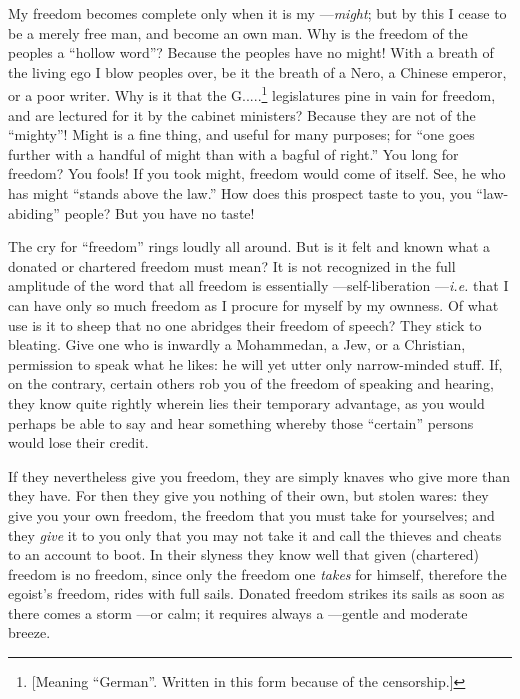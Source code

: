 My freedom becomes complete only when it is my ---\textit{might}; but by this 
I cease to be a merely free man, and become an own man. Why is the freedom of 
the peoples a ``hollow word''? Because the peoples have no might! With a 
breath of the living ego I blow peoples over, be it the breath of a Nero, a 
Chinese emperor, or a poor writer. Why is it that the G.....\footnote{[Meaning 
``German''. Written in this form because of the censorship.]} legislatures 
pine in vain for freedom, and are lectured for it by the cabinet ministers? 
Because they are not of the ``mighty''! Might is a fine thing, and useful 
for many purposes; for ``one goes further with a handful of might than with a 
bagful of right.'' You long for freedom? You fools! If you took might, 
freedom would come of itself. See, he who has might ``stands above the 
law.'' How does this prospect taste to you, you ``law-abiding'' people? But 
you have no taste!

The cry for ``freedom'' rings loudly all around. But is it felt and known 
what a donated or chartered freedom must mean? It is not recognized in the 
full amplitude of the word that all freedom is essentially ---self-liberation ---\textit{i.e.} that I can have only so much freedom as I procure for myself 
by my ownness. Of what use is it to sheep that no one abridges their freedom 
of speech? They stick to bleating. Give one who is inwardly a Mohammedan, a 
Jew, or a Christian, permission to speak what he likes: he will yet utter only 
narrow-minded stuff. If, on the contrary, certain others rob you of the 
freedom of speaking and hearing, they know quite rightly wherein lies their 
temporary advantage, as you would perhaps be able to say and hear something 
whereby those ``certain'' persons would lose their credit.

If they nevertheless give you freedom, they are simply knaves who give more 
than they have. For then they give you nothing of their own, but stolen wares: 
they give you your own freedom, the freedom that you must take for yourselves; 
and they \textit{give} it to you only that you may not take it and call the 
thieves and cheats to an account to boot. In their slyness they know well that 
given (chartered) freedom is no freedom, since only the freedom one 
\textit{takes} for himself, therefore the egoist's freedom, rides with full 
sails. Donated freedom strikes its sails as soon as there comes a storm ---or 
calm; it requires always a ---gentle and moderate breeze.

